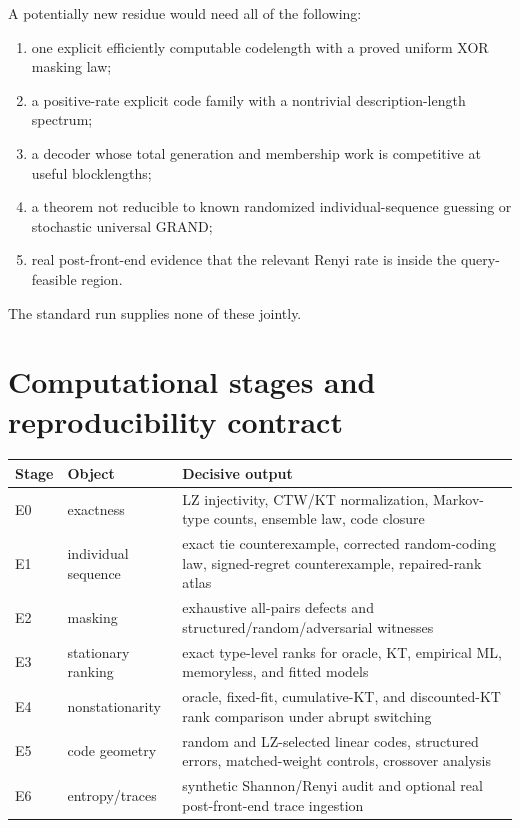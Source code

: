 \documentclass[11pt]{article}
\begin{document}
A potentially new residue would need all of the following:
\begin{enumerate}
  \item one explicit efficiently computable codelength with a proved uniform XOR masking law;
  \item a positive-rate explicit code family with a nontrivial description-length spectrum;
  \item a decoder whose total generation and membership work is competitive at useful blocklengths;
  \item a theorem not reducible to known randomized individual-sequence guessing or stochastic universal GRAND;
  \item real post-front-end evidence that the relevant Renyi rate is inside the query-feasible region.
\end{enumerate}
The standard run supplies none of these jointly.

\section{Computational stages and reproducibility contract}

\begin{longtable}{@{}p{}p{}p{}@{}}
\toprule
Stage & Object & Decisive output \\
\midrule
\endhead
E0 & exactness & LZ injectivity, CTW/KT normalization, Markov-type counts, ensemble law, code closure \\
E1 & individual sequence & exact tie counterexample, corrected random-coding law, signed-regret counterexample, repaired-rank atlas \\
E2 & masking & exhaustive all-pairs defects and structured/random/adversarial witnesses \\
E3 & stationary ranking & exact type-level ranks for oracle, KT, empirical ML, memoryless, and fitted models \\
E4 & nonstationarity & oracle, fixed-fit, cumulative-KT, and discounted-KT rank comparison under abrupt switching \\
E5 & code geometry & random and LZ-selected linear codes, structured errors, matched-weight controls, crossover analysis \\
E6 & entropy/traces & synthetic Shannon/Renyi audit and optional real post-front-end trace ingestion \\
\bottomrule
\end{longtable}
\end{document}
